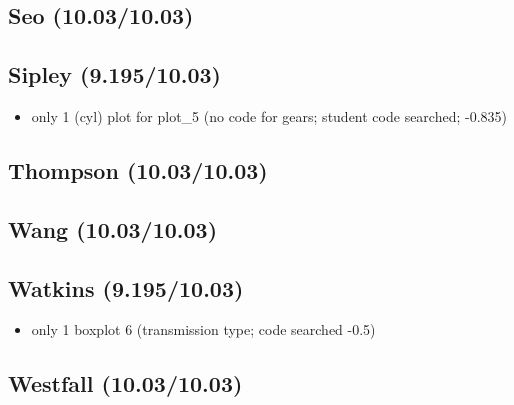 \documentclass[11pt]{article}
\begin{document}
\subsection{Seo (10.03/10.03)}
\label{sec:orgheadline16}
\subsection{Sipley (9.195/10.03)}
\label{sec:orgheadline17}
\begin{itemize}
\item only 1 (cyl) plot for plot\_5 (no code for gears; student code searched; -0.835)
\end{itemize}
\subsection{Thompson (10.03/10.03)}
\label{sec:orgheadline18}
\subsection{Wang (10.03/10.03)}
\label{sec:orgheadline19}
\subsection{Watkins (9.195/10.03)}
\label{sec:orgheadline20}
\begin{itemize}
\item only 1 boxplot 6 (transmission type; code searched -0.5)
\end{itemize}
\subsection{Westfall (10.03/10.03)}
\label{sec:orgheadline21}
\end{document}
